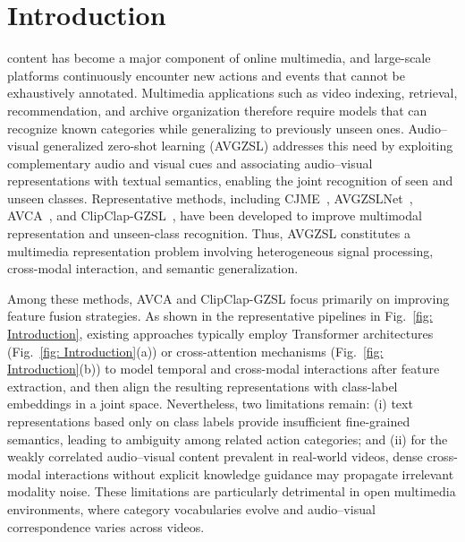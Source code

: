 \documentclass[10pt,journal,twoside]{IEEEtran}
\begin{document}
\section{Introduction}
 content has become a major component of online
multimedia, and large-scale platforms continuously encounter new
actions and events that cannot be exhaustively annotated. Multimedia
applications such as video indexing, retrieval, recommendation, and
archive organization therefore require models that can recognize known
categories while generalizing to previously unseen ones. Audio--visual
generalized zero-shot learning (AVGZSL) addresses this need by
exploiting complementary audio and visual cues and associating
audio--visual representations with textual semantics, enabling the
joint recognition of seen and unseen classes. Representative methods,
including CJME~\cite{3}, AVGZSLNet~\cite{4}, AVCA~\cite{1}, and
ClipClap-GZSL~\cite{2}, have been developed to improve multimodal
representation and unseen-class recognition. Thus, AVGZSL constitutes
a multimedia representation problem involving heterogeneous signal
processing, cross-modal interaction, and semantic generalization.

Among these methods, AVCA and ClipClap-GZSL focus primarily on
improving feature fusion strategies. As shown in the representative
pipelines in Fig.~\ref{fig: Introduction}, existing approaches typically
employ Transformer architectures
(Fig.~\ref{fig: Introduction}(a)) or cross-attention mechanisms
(Fig.~\ref{fig: Introduction}(b)) to model temporal and cross-modal
interactions after feature extraction, and then align the resulting
representations with class-label embeddings in a joint space.
Nevertheless, two limitations remain: (i) text representations based
only on class labels provide insufficient fine-grained semantics,
leading to ambiguity among related action categories; and (ii) for the
weakly correlated audio--visual content prevalent in real-world videos,
dense cross-modal interactions without explicit knowledge guidance may
propagate irrelevant modality noise. These limitations are particularly
detrimental in open multimedia environments, where category
vocabularies evolve and audio--visual correspondence varies across
videos.
\end{document}
